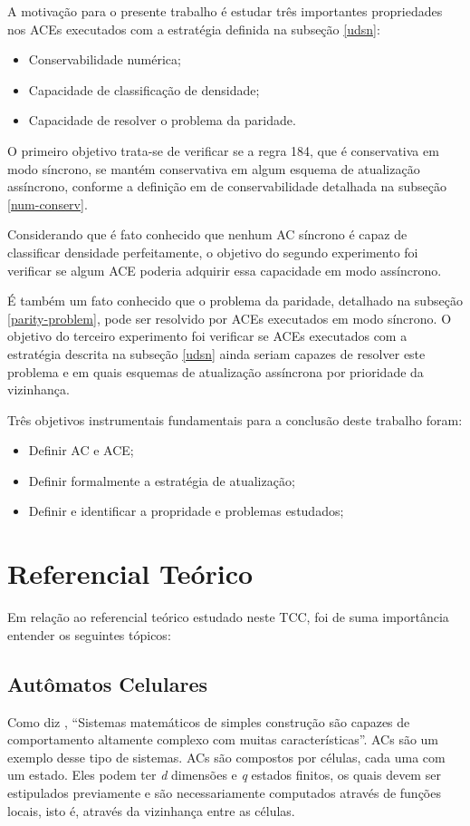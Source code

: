 \documentclass[a4paper,12pt]{ltxdoc}
\newcommand\tab[1][1cm]{\hspace*{#1}}
\begin{document}
A motivação para o presente trabalho é estudar três importantes propriedades nos ACEs executados com a estratégia definida na subseção \ref{udsn}: 

\begin{itemize}
  \item Conservabilidade numérica;
  \item Capacidade de classificação de densidade;
  \item Capacidade de resolver o problema da paridade.
\end{itemize}

\tab O primeiro objetivo trata-se de verificar se a regra 184, que é conservativa em modo síncrono, se mantém conservativa em algum esquema de atualização assíncrono, conforme a definição em de conservabilidade detalhada na subseção \ref{num-conserv}. 

\tab Considerando que é fato conhecido que nenhum AC síncrono é capaz de classificar densidade perfeitamente, o objetivo do segundo experimento foi verificar se algum ACE poderia adquirir essa capacidade em modo assíncrono.

\tab É também um fato conhecido que o problema da paridade, detalhado na subseção \ref{parity-problem}, pode ser resolvido por ACEs executados em modo síncrono. O objetivo do terceiro experimento foi verificar se ACEs executados com a estratégia descrita na subseção \ref{udsn} ainda seriam capazes de resolver este problema e em quais esquemas de atualização assíncrona por prioridade da vizinhança.

\tab Três objetivos instrumentais fundamentais para a conclusão deste trabalho foram:

\begin{itemize}
  \item Definir AC e ACE;
  \item Definir formalmente a estratégia de atualização;
  \item Definir e identificar a propridade e problemas estudados;
\end{itemize}

\section{Referencial Teórico} \label{referencial}
Em relação ao referencial teórico estudado neste TCC, foi de suma importância entender os seguintes tópicos:

\subsection{Autômatos Celulares} \label{ref_ac}
Como diz \cite{wolfram1983cellular}, ``Sistemas matemáticos de simples construção são capazes de comportamento altamente complexo com muitas características''. ACs são um exemplo desse tipo de sistemas. ACs são compostos por células, cada uma com um estado. Eles podem ter \textit{d} dimensões e \textit{q} estados finitos, os quais devem ser estipulados previamente e são necessariamente computados através de funções locais, isto é, através da vizinhança entre as células.
\end{document}

